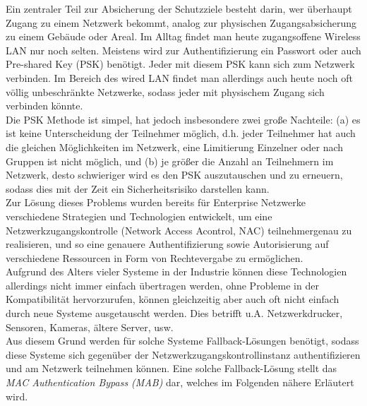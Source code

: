 \documentclass[conference]{IEEEtran}
\begin{document}
Ein zentraler Teil zur Absicherung der Schutzziele besteht darin, wer überhaupt Zugang zu einem Netzwerk bekommt, analog zur physischen Zugangsabsicherung zu einem Gebäude oder Areal. Im Alltag findet man heute zugangsoffene Wireless LAN nur noch selten. Meistens wird zur Authentifizierung ein Passwort oder auch Pre-shared Key (PSK) benötigt. Jeder mit diesem PSK kann sich zum Netzwerk verbinden. Im Bereich des wired LAN findet man allerdings auch heute noch oft völlig unbeschränkte Netzwerke, sodass jeder mit physischem Zugang sich verbinden könnte.\\

Die PSK Methode ist simpel, hat jedoch insbesondere zwei große Nachteile:
(a) es ist keine Unterscheidung der Teilnehmer möglich, d.h. jeder Teilnehmer hat auch die gleichen Möglichkeiten im Netzwerk, eine Limitierung Einzelner oder nach Gruppen ist nicht möglich, und
(b) je größer die Anzahl an Teilnehmern im Netzwerk, desto schwieriger wird es den PSK auszutauschen und zu erneuern, sodass dies mit der Zeit ein Sicherheitsrisiko darstellen kann.\\

Zur Lösung dieses Problems wurden bereits für Enterprise Netzwerke verschiedene Strategien und Technologien entwickelt, um eine Netzwerkzugangskontrolle (Network Access Acontrol, NAC) teilnehmergenau zu realisieren, und so eine genauere Authentifizierung sowie Autorisierung auf verschiedene Ressourcen in Form von Rechtevergabe zu ermöglichen.\\

Aufgrund des Alters vieler Systeme in der Industrie können diese Technologien allerdings nicht immer einfach übertragen werden, ohne Probleme in der Kompatibilität hervorzurufen, können gleichzeitig aber auch oft nicht einfach durch neue Systeme ausgetauscht werden. Dies betrifft u.A. Netzwerkdrucker, Sensoren, Kameras, ältere Server, usw.\\

Aus diesem Grund werden für solche Systeme Fallback-Lösungen benötigt, sodass diese Systeme sich gegenüber der Netzwerkzugangskontrollinstanz authentifizieren und am Netzwerk teilnehmen können. Eine solche Fallback-Lösung stellt das \emph{MAC Authentication Bypass (MAB)} dar, welches im Folgenden nähere Erläutert wird.

%

\vspace{1em}
\end{document}
